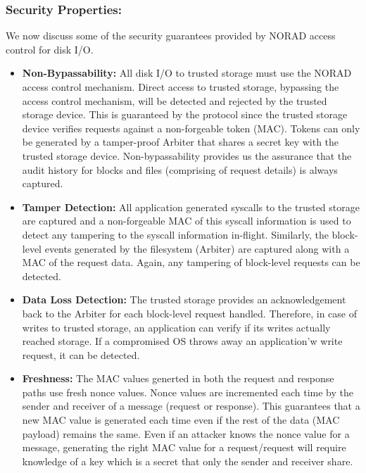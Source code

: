 \documentclass[withindex,glossary]{cam-thesis}
\begin{document}
\subsubsection{Security Properties:}
We now discuss some of the security guarantees provided by NORAD access control for disk I/O.

\begin{itemize}

\item \textbf{Non-Bypassability:}
All disk I/O to trusted storage must use the NORAD access control mechanism.
Direct access to trusted storage, bypassing the access control mechanism, will be detected and rejected by the trusted storage device.
This is guaranteed by the protocol since the trusted storage device verifies requests against a non-forgeable token (MAC).
Tokens can only be generated by a tamper-proof Arbiter that shares a secret key with the trusted storage device.
Non-bypassability provides us the assurance that the audit history for blocks and files (comprising of request details) is always captured.

\item \textbf{Tamper Detection:}
All application generated syscalls to the trusted storage are captured and a non-forgeable MAC of this syscall information is used to detect any tampering to the syscall information in-flight.
Similarly, the block-level events generated by the filesystem (Arbiter) are captured along with a MAC of the request data.
Again, any tampering of block-level requests can be detected.

\item \textbf{Data Loss Detection:}
The trusted storage provides an acknowledgement back to the Arbiter for each block-level request handled.
Therefore, in case of writes to trusted storage, an application can verify if its writes actually reached storage.
If a compromised OS throws away an application'w write request, it can be detected.

\item \textbf{Freshness:}
The MAC values generted in both the request and response paths use fresh nonce values.
Nonce values are incremented each time by the sender and receiver of a message (request or response).
This guarantees that a new MAC value is generated each time even if the rest of the data (MAC payload) remains the same.
Even if an attacker knows the nonce value for a message, generating the right MAC value for a request/request will require knowledge of a key which is a secret that only the sender and receiver share.

\end{itemize}
\end{document}
